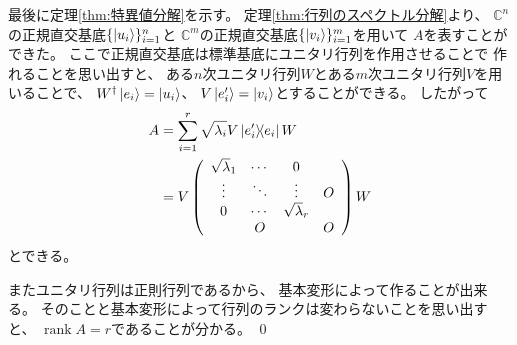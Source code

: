 \documentclass[a4paper, 10pt]{jsarticle}
\DeclareMathOperator{\rank}{rank}
\begin{document}
最後に定理\ref{thm:特異値分解}を示す。
定理\ref{thm:行列のスペクトル分解}より、
$\mathbb{C}^n$の正規直交基底$\{\Ket{u_i}\}_{i=1}^n$と
$\mathbb{C}^m$の正規直交基底$\{\Ket{v_i}\}_{i=1}^m$を用いて
$A$を表すことができた。
ここで正規直交基底は標準基底にユニタリ行列を作用させることで
作れることを思い出すと、
ある$n$次ユニタリ行列$W$とある$m$次ユニタリ行列$V$を用いることで、
$W^\dagger \Ket{e_i} = \Ket{u_i}$、
$V \Ket{e'_i} = \Ket{v_i}$とすることができる。
したがって
\begin{align}
	A &= \sum_{i=1}^r \sqrt{\lambda_i} V \Ketbra{e'_i}{e_i} W \\
	&= V \left( \begin{array}{cccc}
		\sqrt{\lambda}_1 & \cdots & 0 & \\
		\vdots & \ddots & \vdots & \Huge{O} \\
		0 & \cdots & \sqrt{\lambda}_r & \\
		& \Huge{O} & & \Huge{O}
	\end{array} \right) W
\end{align}
とできる。

またユニタリ行列は正則行列であるから、
基本変形によって作ることが出来る。
そのことと基本変形によって行列のランクは変わらないことを思い出すと、
$\rank A = r$であることが分かる。
\qed
\end{document}

